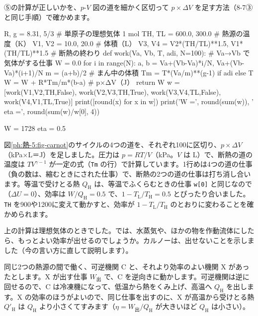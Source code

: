 ⑤の計算が正しいかを、$p$-$V$ 図の道を細かく区切って $p\times\Delta V$ を足す方法（8-7③と同じ手順）で確かめます。
\begin{phcode}
R, g = 8.31, 5/3              \# 単原子の理想気体 1 mol
TH, TL = 600.0, 300.0         \# 熱源の温度（K）
V1, V2 = 10.0, 20.0           \# 体積（L）
V3, V4 = V2*(TH/TL)**1.5, V1*(TH/TL)**1.5  \# 断熱の終わり
def work(Va, Vb, T, adi, N=100):   \# Va→Vb で気体がする仕事
    W = 0.0
    for i in range(N):
        a, b = Va+(Vb-Va)*i/N, Va+(Vb-Va)*(i+1)/N
        m = (a+b)/2                \# まん中の体積
        Tm = T*(Va/m)**(g-1) if adi else T
        W = W + R*Tm/m*(b-a)       \# p×ΔV（J）
    return W
w = [work(V1,V2,TH,False), work(V2,V3,TH,True),
     work(V3,V4,TL,False), work(V4,V1,TL,True)]
print([round(x) for x in w])
print('W =', round(sum(w)), ' eta =', round(sum(w)/w[0], 4))
\end{phcode}
\begin{phcodeout}[実行結果]
[3456, 3739, -1728, -3739]
W = 1728  eta = 0.5
\end{phcodeout}
図\ref{ph:熱-5:fig-carnot}のサイクルの4つの道を、それぞれ100に区切り、$p\times\Delta V$（kPa×L＝J）を足しました。圧力は $p=RT/V$（kPa。$V$ は L）で、断熱の道の温度は $TV^{\gamma-1}$ が一定の式（\texttt{Tm} の行）で計算しています。1行めは4つの道の仕事（負の数は、縮むときにされた仕事）で、断熱の2つの道の仕事は打ち消し合います。等温で受けとる熱 $Q_{\mathrm H}$ は、等温でふくらむときの仕事 \texttt{w[0]} と同じなので（$\Delta U=0$）、効率は $W/Q_{\mathrm H}=0.5$ で、$1-T_{\mathrm L}/T_{\mathrm H}=0.5$ とぴったり合いました。\texttt{TH} を900や1200に変えて動かすと、効率が $1-T_{\mathrm L}/T_{\mathrm H}$ のとおりに変わることを確かめられます。

上の計算は理想気体のときでした。では、水蒸気や、ほかの物を作動流体にしたら、もっとよい効率が出せるのでしょうか。カルノーは、出せないことを示しました（今の言い方に直して説明します）。

同じ2つの熱源の間で働く、可逆機関 C と、それより効率のよい機関 X があったとします。X が出す仕事 $W_{\text{出}}$ で、C を逆向きに動かします。可逆機関は逆に回せるので、C は冷凍機になって、低温から熱をくみ上げ、高温へ $Q_{\mathrm H}$ を出します。X の効率のほうがよいので、同じ仕事を出すのに、X が高温から受けとる熱 $Q'_{\mathrm H}$ は $Q_{\mathrm H}$ より小さくてすみます（$\eta=W_{\text{出}}/Q_{\mathrm H}$ が大きいほど $Q_{\mathrm H}$ は小さい）。

